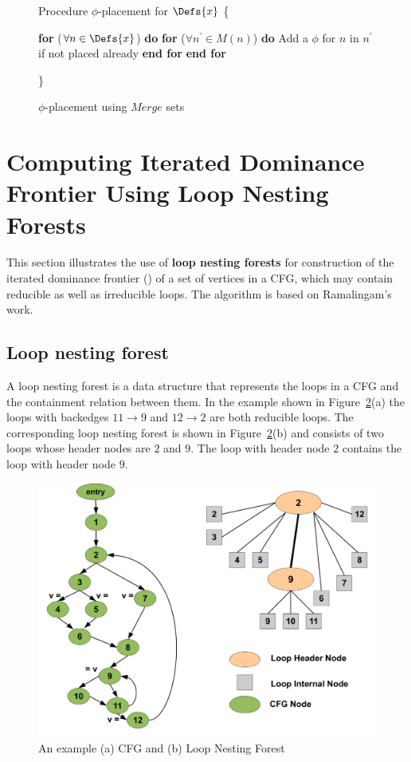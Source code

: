 {\begin{figure}[!ht]
\begin{minipage}[t]{5in}
\setcounter{linectr}{0}

Procedure $\phi$-placement for $\Defs{x}$
\{
\begin{code}
 {\bf for} ($\forall n \in \Defs{x}$) {\bf do}
   {\bf for} ($\forall n^{'} \in M(n)$) {\bf do}
       Add a $\phi$ for $n$ in $n^{'}$ if not placed already
   {\bf end for}
 {\bf end for}
\end{code}
\}
\end{minipage}
\caption{$\phi$-placement using $Merge$ sets}
\label{F:phip}
\end{figure} 


\section{Computing Iterated Dominance Frontier Using Loop Nesting Forests}
\label{section:alternative_ssa_construction_algorithms:loop}
This section illustrates the use of {\bf loop nesting forests} for construction of the iterated dominance frontier (\iDF) of a set of vertices in a CFG, which may contain reducible as well as
irreducible loops. The algorithm is based on Ramalingam's work.

    \subsection{Loop nesting forest}
     A loop nesting forest is a data structure that represents the loops in a CFG and the containment relation between them. In the example shown in Figure~\ref{fig:lnf}(a) the loops with backedges $11 \rightarrow 9$ and $12 \rightarrow 2$ are both reducible loops. The corresponding loop nesting forest is shown in Figure~\ref{fig:lnf}(b) and consists of two loops whose header nodes are $2$ and $9$. The loop with header node $2$ contains the loop with header node $9$.

    \begin{figure}[htb]
    \centerline{\includegraphics[scale=0.3]{lnfred.pdf}}
    \caption{An example (a) CFG and (b) Loop Nesting Forest }
    \label{fig:lnf}
    \end{figure} 


}

